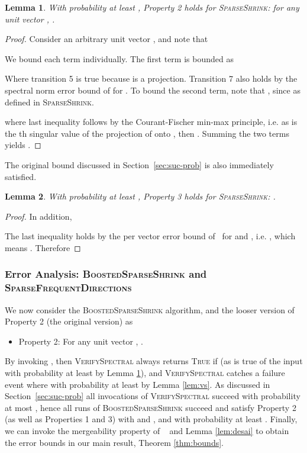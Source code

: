 \documentclass[11pt]{article}
\newcommand{\sfd}{\textsc{SparseFrequentDirections}\xspace}
\newcommand{\SSh}{\textsc{SparseShrink}\xspace}
\newcommand{\BSSh}{\textsc{BoostedSparseShrink}\xspace}
\newcommand{\vs}{\textsc{VerifySpectral}\xspace}
\newtheorem{lemma}{Lemma}[section]
\newcommand{\denselist}{\itemsep -2pt\parsep=-1pt\partopsep -2pt}
\begin{document}
\begin{lemma}
With probability at least , Property 2 holds for \SSh: for any unit vector , . \label{fact1}
\end{lemma}
\begin{proof}
Consider an arbitrary unit vector , and note that

We bound each term individually.  The first term is bounded as
 
Where transition 5 is true because  is a projection. Transition 7 also holds by the spectral norm error bound of \cite{musco2015stronger} for .
To bound the second term, note that , since  as defined in \SSh. 

where last inequality follows by the Courant-Fischer min-max principle, i.e. as  is the th singular value of the projection of  onto , then . Summing the two terms yields .
\end{proof}

The original bound  discussed in Section~\ref{sec:suc-prob} is also immediately satisfied.





\begin{lemma}
With probability at least , Property 3 holds for \SSh: .  
\label{lem:prop3}
\end{lemma}
\begin{proof}
In addition, 

The last inequality holds by the per vector error bound of~\cite{musco2015stronger} for  and , i.e. 
, which means .
Therefore 

\end{proof}



\subsubsection{Error Analysis: \BSSh and \sfd}
We now consider the \BSSh algorithm, and the looser version of Property 2 (the original version) as
\begin{itemize} \denselist
\item Property 2: For any unit vector , .  
\end{itemize}
By invoking , then \vs always returns \textsc{True} if 
 (as is true of the input with probability at least  by Lemma \ref{fact1}), and 
\vs catches a failure event where  with probability at least  by Lemma \ref{lem:vs}.  
As discussed in Section~\ref{sec:suc-prob} all invocations of \vs succeed with probability at most , hence all runs of \BSSh succeed and satisfy Property 2 (as well as Properties 1 and 3) with  and , and with probability at least .
Finally, we can invoke the mergeability property of ~\cite{Lib12} and Lemma \ref{lem:desai} to obtain the error bounds in our main result, Theorem \ref{thm:bounds}.  
\end{document}

